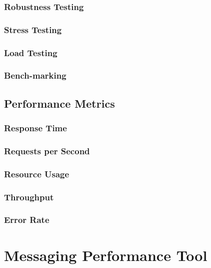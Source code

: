 \subsection*{Robustness Testing}

\subsection*{Stress Testing}

\subsection*{Load Testing}

\subsection*{Bench-marking}

\section{Performance Metrics}
\label{Performance Metrics}

\subsection{Response Time}

\subsection{Requests per Second}

\subsection{Resource Usage}

\subsection{Throughput}

\subsection{Error Rate}

\chapter{Messaging Performance Tool}
\label{Messaging Performance Tool}


